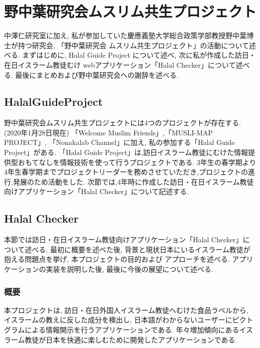 \chapter{野中葉研究会ムスリム共生プロジェクト}
中澤仁研究室に加え, 私が参加していた慶應義塾大学総合政策学部教授野中葉博士が持つ研究会,
「野中葉研究会 ムスリム共生プロジェクト」の活動について述べる.
まずはじめに, Halal Guide Project について述べ, 次に私が作成した訪日・在日イスラーム教徒むけ
webアプリケーション「Halal Checker」について述べる.
最後にまとめおよび野中葉研究会への謝辞を述べる.

\section{HalalGuideProject}
野中葉研究会ムスリム共生プロジェクトには4つのプロジェクトが存在する.(2020年1月28日現在)
「Welcome Muslim Friends」,「MUSLI-MAP PROJECT」, 「Nonakalab Channel」に加え,
私の参加する「Halal Guide Project」がある.
「Halal Guide Project」は,訪日イスラーム教徒にむけた情報提供型おもてなしを情報技術を使って行うプロジェクトである.
3年生の春学期より4年生春学期までプロジェクトリーダーを務めさせていただき,プロジェクトの進行,発展のため活動をした.
次節では,4年時に作成した訪日・在日イスラーム教徒向けアプリケーション「Halal Checker」について記述する.

\section{Halal Checker}
本節では訪日・在日イスラーム教徒向けアプリケーション「Halal Checker」について述べる.
最初に概要を述べた後, 背景と現状日本にいるイスラーム教徒が抱える問題点を挙げ, 本プロジェクトの目的および
アプローチを述べる. アプリケーションの実装を説明した後, 最後に今後の展望について述べる.
\subsection{概要}
本プロジェクトは, 訪日・在日外国人イスラーム教徒へむけた食品ラベルから, イスラームの教えに反した成分を検出し,
日本語がわからないユーザーにピクトグラムによる情報開示を行うアプリケーションである.
年々増加傾向にあるイスラーム教徒が日本を快適に楽しむために開発したアプリケーションである.

